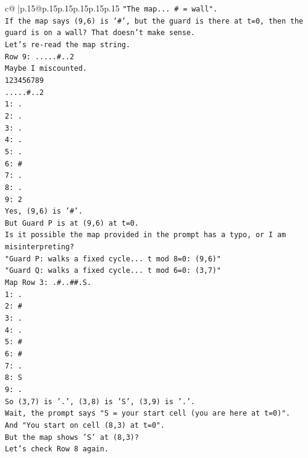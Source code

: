 \documentclass{article}
\begin{document}
{\begin{supertabular}{c@{$\;$}|p{.15\linewidth}@{}p{.15\linewidth}p{.15\linewidth}p{.15\linewidth}p{.15\linewidth}p{.15\linewidth}}
{{{\texttt{"The map... \# = wall".} \\
\texttt{If the map says (9,6) is '\#', but the guard is there at t=0, then the guard is on a wall? That doesn't make sense.} \\
\texttt{Let's re{-}read the map string.} \\
\texttt{Row 9: .....\#..2} \\
\texttt{Maybe I miscounted.} \\
\texttt{123456789} \\
\texttt{.....\#..2} \\
\texttt{1: .} \\
\texttt{2: .} \\
\texttt{3: .} \\
\texttt{4: .} \\
\texttt{5: .} \\
\texttt{6: \#} \\
\texttt{7: .} \\
\texttt{8: .} \\
\texttt{9: 2} \\
\texttt{Yes, (9,6) is '\#'.} \\
\texttt{But Guard P is at (9,6) at t=0.} \\
\texttt{Is it possible the map provided in the prompt has a typo, or I am misinterpreting?} \\
\texttt{"Guard P: walks a fixed cycle... t mod 8=0: (9,6)"} \\
\texttt{"Guard Q: walks a fixed cycle... t mod 6=0: (3,7)"} \\
\texttt{Map Row 3: .\#..\#\#.S.} \\
\texttt{1: .} \\
\texttt{2: \#} \\
\texttt{3: .} \\
\texttt{4: .} \\
\texttt{5: \#} \\
\texttt{6: \#} \\
\texttt{7: .} \\
\texttt{8: S} \\
\texttt{9: .} \\
\texttt{So (3,7) is '.', (3,8) is 'S', (3,9) is '.'.} \\
\texttt{Wait, the prompt says "S = your start cell (you are here at t=0)".} \\
\texttt{And "You start on cell (8,3) at t=0".} \\
\texttt{But the map shows 'S' at (8,3)?} \\
\texttt{Let's check Row 8 again.} \\
}}}
\end{supertabular}}
\end{document}
